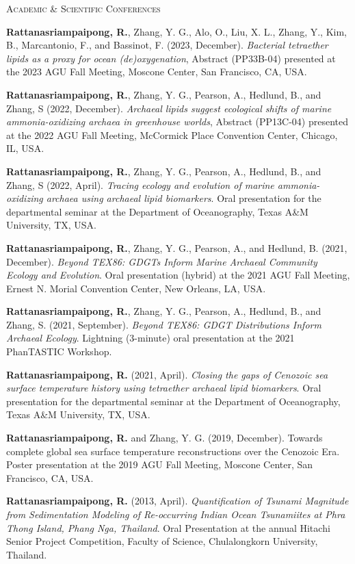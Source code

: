 \documentclass[11pt, letter]{article}
\newcommand{\myname}[1]{\textbf{Rattanasriampaipong, R.}}
\newcommand{\margintext}[1]{\marginnote{\normalsize\textbf #1 |}}
\begin{document}
\margintext{Presentations} 
\textsc{Academic \& Scientific Conferences}
\begin{etaremune}
\item {\myname{rattanasriampaipong}}, Zhang, Y. G., Alo, O., Liu, X. L., Zhang, Y., Kim, B., Marcantonio, F., and Bassinot, F. (2023, December). \textit{Bacterial tetraether lipids as a proxy for ocean (de)oxygenation}, Abstract (PP33B-04) presented at the 2023 AGU Fall Meeting, Moscone Center, San Francisco, CA, USA.

\item {\myname{rattanasriampaipong}}, Zhang, Y. G., Pearson, A., Hedlund, B., and Zhang, S (2022, December). \textit{Archaeal lipids suggest ecological shifts of marine ammonia-oxidizing archaea in greenhouse worlds}, Abstract (PP13C-04) presented at the 2022 AGU Fall Meeting, McCormick Place Convention Center, Chicago, IL, USA.

\item {\myname{rattanasriampaipong}}, Zhang, Y. G., Pearson, A., Hedlund, B., and Zhang, S (2022, April). \textit{Tracing ecology and evolution of marine ammonia-oxidizing archaea using archaeal lipid biomarkers}. Oral presentation for the departmental seminar at the Department of Oceanography, Texas A\&M University, TX, USA.

\item {\myname{rattanasriampaipong}}, Zhang, Y. G., Pearson, A., and Hedlund, B. (2021, December). \textit{Beyond TEX86: GDGTs Inform Marine Archaeal Community Ecology and Evolution}. Oral presentation (hybrid) at the 2021 AGU Fall Meeting, Ernest N. Morial Convention Center, New Orleans, LA, USA.

\item {\myname{rattanasriampaipong}}, Zhang, Y. G., Pearson, A., Hedlund, B., and Zhang, S. (2021, September). \textit{Beyond TEX86: GDGT Distributions Inform Archaeal Ecology}. Lightning (3-minute) oral presentation at the 2021 PhanTASTIC Workshop.

\item {\myname{rattanasriampaipong}} (2021, April). \textit{Closing the gaps of Cenozoic sea surface temperature history using tetraether archaeal lipid biomarkers}. Oral presentation for the departmental seminar at the Department of Oceanography, Texas A\&M University, TX, USA.

\item {\myname{rattanasriampaipong}} and Zhang, Y. G. (2019, December). Towards complete global sea surface temperature reconstructions over the Cenozoic Era. Poster presentation at the 2019 AGU Fall Meeting, Moscone Center, San Francisco, CA, USA.

\item {\myname{rattanasriampaipong}} (2013, April). \textit{Quantification of Tsunami Magnitude from Sedimentation Modeling of Re-occurring Indian Ocean Tsunamiites at Phra Thong Island, Phang Nga, Thailand}. Oral Presentation at the annual Hitachi Senior Project Competition, Faculty of Science, Chulalongkorn University, Thailand.
\end{etaremune}
\end{document}
